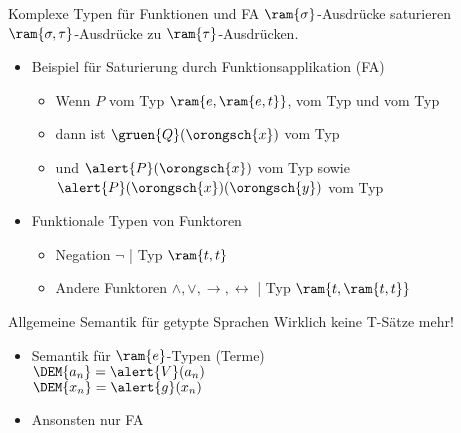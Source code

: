 \begin{frame}
  {Komplexe Typen für Funktionen und FA}
  \onslide<+->
  \onslide<+->
  $\ram{\sigma}$-Ausdrücke saturieren $\ram{\sigma,\tau}$-Ausdrücke zu $\ram{\tau}$-Ausdrücken.\\
  \Zeile
  \begin{itemize}[<+->]
    \item Beispiel für Saturierung durch \alert{Funktionsapplikation (FA)}
      \begin{itemize}[<+->]
        \item Wenn \alert{$P$} vom Typ \alert{$\ram{e,\ram{e,t}}$},  vom Typ  und  vom Typ 
        \item dann ist $\gruen{Q}(\orongsch{x})$ vom Typ 
        \item und $\alert{P}(\orongsch{x})$ vom Typ  sowie $\alert{P}(\orongsch{x})(\orongsch{y})$ vom Typ 
      \end{itemize}
      \Zeile
    \item Funktionale Typen von \alert{Funktoren}
      \begin{itemize}[<+->]
        \item Negation $\neg$ | Typ \alert{$\ram{t,t}$}
        \item Andere Funktoren $\wedge,\vee,\rightarrow,\leftrightarrow$ | Typ \alert{$\ram{t,\ram{t,t}}$}
      \end{itemize}
  \end{itemize}
\end{frame}

\begin{frame}
  {Allgemeine Semantik für getypte Sprachen}
  \onslide<+->
  \onslide<+->
  Wirklich keine T-Sätze mehr!\\
  \Zeile
  \begin{itemize}[<+->]
    \item Semantik für $\ram{e}$-Typen (Terme)\\
      \Viertelzeile
      $\DEM{a_n} = \alert{V}(a_n)$ \\
      $\DEM{x_n} = \alert{g}(x_n)$
      \Halbzeile
    \item Ansonsten nur FA\\
      \bl{$\DEM{\delta(\alpha)} = \DEM{\delta}(\DEM{\alpha})$}
  \end{itemize}
\end{frame}

